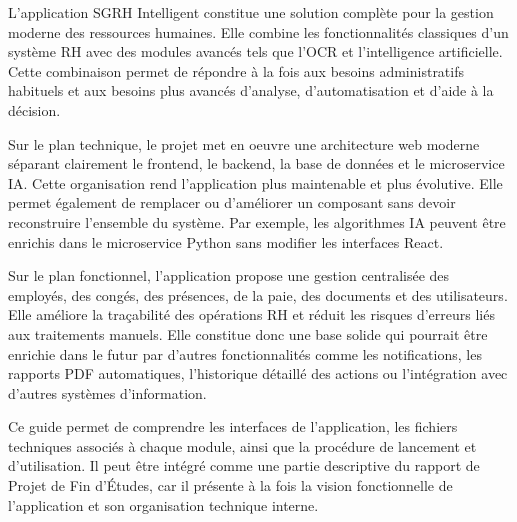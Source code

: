 \documentclass[12pt,a4paper]{report}
\begin{document}
L'application SGRH Intelligent constitue une solution complète pour la gestion moderne des ressources humaines. Elle combine les fonctionnalités classiques d'un système RH avec des modules avancés tels que l'OCR et l'intelligence artificielle. Cette combinaison permet de répondre à la fois aux besoins administratifs habituels et aux besoins plus avancés d'analyse, d'automatisation et d'aide à la décision.

Sur le plan technique, le projet met en oeuvre une architecture web moderne séparant clairement le frontend, le backend, la base de données et le microservice IA. Cette organisation rend l'application plus maintenable et plus évolutive. Elle permet également de remplacer ou d'améliorer un composant sans devoir reconstruire l'ensemble du système. Par exemple, les algorithmes IA peuvent être enrichis dans le microservice Python sans modifier les interfaces React.

Sur le plan fonctionnel, l'application propose une gestion centralisée des employés, des congés, des présences, de la paie, des documents et des utilisateurs. Elle améliore la traçabilité des opérations RH et réduit les risques d'erreurs liés aux traitements manuels. Elle constitue donc une base solide qui pourrait être enrichie dans le futur par d'autres fonctionnalités comme les notifications, les rapports PDF automatiques, l'historique détaillé des actions ou l'intégration avec d'autres systèmes d'information.

Ce guide permet de comprendre les interfaces de l'application, les fichiers techniques associés à chaque module, ainsi que la procédure de lancement et d'utilisation. Il peut être intégré comme une partie descriptive du rapport de Projet de Fin d'Études, car il présente à la fois la vision fonctionnelle de l'application et son organisation technique interne.
\end{document}
